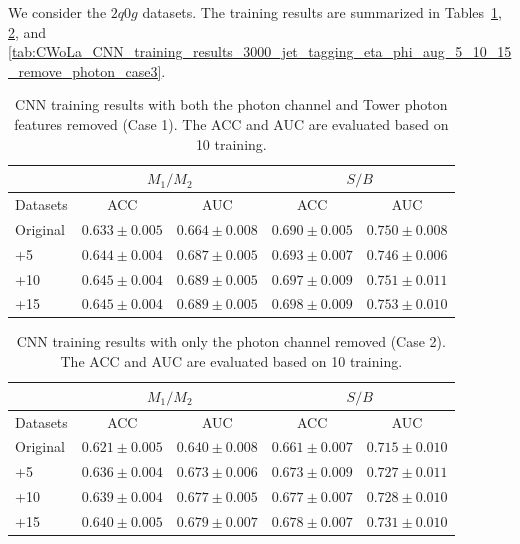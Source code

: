 \documentclass[12pt]{article}
\begin{document}
    We consider the $2q0g$ datasets. The training results are summarized in Tables~\ref{tab:CWoLa_CNN_training_results_3000_jet_tagging_eta_phi_aug_5_10_15_remove_photon}, \ref{tab:CWoLa_CNN_training_results_3000_jet_tagging_eta_phi_aug_5_10_15_remove_photon_channel}, and \ref{tab:CWoLa_CNN_training_results_3000_jet_tagging_eta_phi_aug_5_10_15_remove_photon_case3}. 
    \begin{table}[htpb]
        \centering
        \caption{CNN training results with both the photon channel and Tower photon features removed (Case 1). The ACC and AUC are evaluated based on 10 training.}
        \label{tab:CWoLa_CNN_training_results_3000_jet_tagging_eta_phi_aug_5_10_15_remove_photon}
        \begin{tabular}{l|cc|cc}
                     & \multicolumn{2}{c|}{$M_1 / M_2$}      & \multicolumn{2}{c}{$S / B$}           \\ \hline
            Datasets & ACC               & AUC               & ACC               & AUC               \\ \hline
            Original & $0.633 \pm 0.005$ & $0.664 \pm 0.008$ & $0.690 \pm 0.005$ & $0.750 \pm 0.008$ \\
            +5       & $0.644 \pm 0.004$ & $0.687 \pm 0.005$ & $0.693 \pm 0.007$ & $0.746 \pm 0.006$ \\
            +10      & $0.645 \pm 0.004$ & $0.689 \pm 0.005$ & $0.697 \pm 0.009$ & $0.751 \pm 0.011$ \\
            +15      & $0.645 \pm 0.004$ & $0.689 \pm 0.005$ & $0.698 \pm 0.009$ & $0.753 \pm 0.010$
        \end{tabular}
    \end{table}

    \begin{table}[htpb]
        \centering
        \caption{CNN training results with only the photon channel removed (Case 2). The ACC and AUC are evaluated based on 10 training.}
        \label{tab:CWoLa_CNN_training_results_3000_jet_tagging_eta_phi_aug_5_10_15_remove_photon_channel}
        \begin{tabular}{l|cc|cc}
                     & \multicolumn{2}{c|}{$M_1 / M_2$}      & \multicolumn{2}{c}{$S / B$}           \\ \hline
            Datasets & ACC               & AUC               & ACC               & AUC               \\ \hline
            Original & $0.621 \pm 0.005$ & $0.640 \pm 0.008$ & $0.661 \pm 0.007$ & $0.715 \pm 0.010$ \\
            +5       & $0.636 \pm 0.004$ & $0.673 \pm 0.006$ & $0.673 \pm 0.009$ & $0.727 \pm 0.011$ \\
            +10      & $0.639 \pm 0.004$ & $0.677 \pm 0.005$ & $0.677 \pm 0.007$ & $0.728 \pm 0.010$ \\
            +15      & $0.640 \pm 0.005$ & $0.679 \pm 0.007$ & $0.678 \pm 0.007$ & $0.731 \pm 0.010$
        \end{tabular}
    \end{table}
\end{document}

